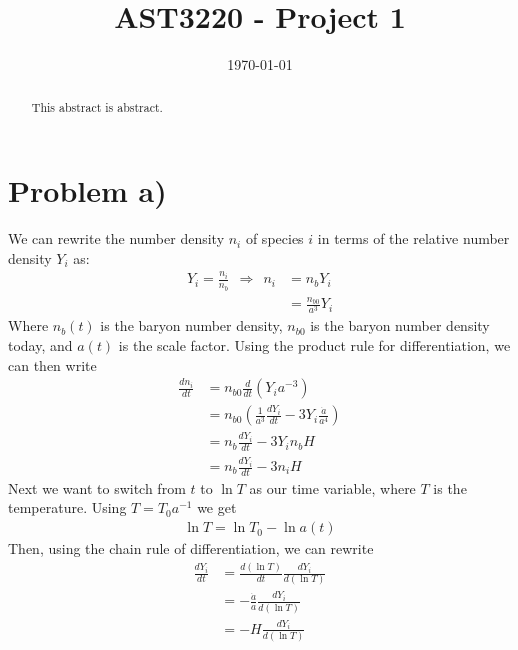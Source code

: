 \documentclass[reprint,english,notitlepage]{revtex4-1}  %
\numberwithin{equation}{section}
\begin{document}
\title{AST3220 - Project 1}   %
\date{\today}                             %
\noaffiliation                            %
\begin{abstract}                          %
This abstract is abstract.                %
\end{abstract}                            %
\maketitle                                %

\section{Problem a)}
 We can rewrite the number density $n_i$ of species $i$ in terms of the relative number
 density $Y_i$ as:
\begin{align}
	Y_i = \frac{n_i}{n_b} \ \ \Rightarrow \ \ n_i &= n_b Y_i \label{eq:rel_no_density} \\
																						&= \frac{n_{b0}}{a^3}Y_i
\end{align}
Where $n_b(t)$ is the baryon number density, $n_{b0}$ is the baryon number
density today, and $a(t)$ is the scale factor. Using the product rule for
differentiation, we can then write
\begin{align}
	\frac{d n_i}{dt} &= n_{b0}\frac{d}{dt}\left(Y_i a^{-3}\right) \\
									 &= n_{b0}\left(\frac{1}{a^3}\frac{dY_i}{dt} - 3Y_i\frac{\dot{a}}{a^4}\right) \\
									 &= n_b \frac{dY_i}{dt} - 3 Y_i n_b H \label{eq:no_density} \\
									 &= n_b \frac{dY_i}{dt} - 3 n_i H \label{eq:no_density}
\end{align}
Next we want to switch from $t$ to $\ln T$ as our time variable, where
$T$ is the temperature. Using $T=T_0 a^{-1}$ we get
\begin{align}
	\ln T = \ln T_0 - \ln a(t)
\end{align}
Then, using the chain rule of differentiation, we can rewrite
\begin{align}
	\frac{dY_i}{dt} &= \frac{d(\ln T)}{dt} \frac{dY_i}{d(\ln T)} \\
									&= -\frac{\dot{a}}{a} \frac{dY_i}{d(\ln T)} \\
									&= -H \frac{dY_i}{d(\ln T)}
\end{align}
\end{document}
